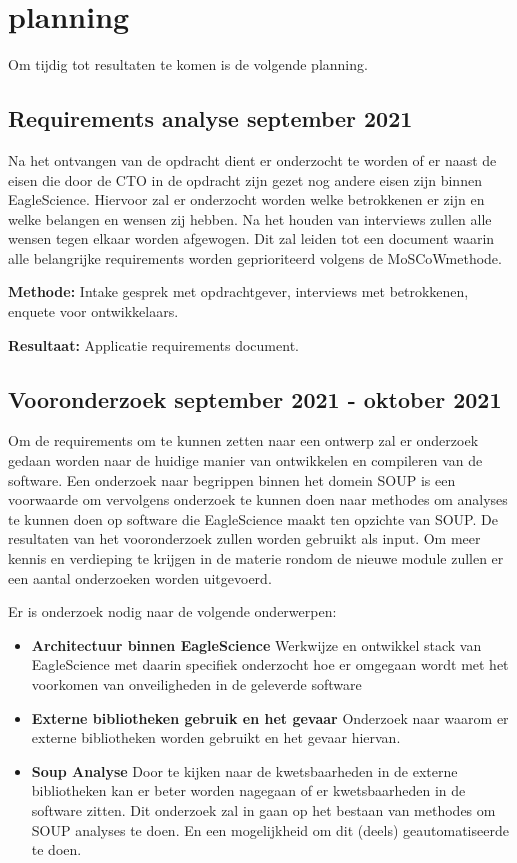 \section{planning}\label{sec:planning}
Om tijdig tot resultaten te komen is de volgende planning.

\subsection{Requirements analyse \textbf{september 2021}}\label{subsec:requirements-analyse}
Na het ontvangen van de opdracht dient er onderzocht te worden of er naast de eisen die door de CTO in de opdracht zijn gezet nog andere eisen zijn binnen EagleScience. Hiervoor zal er onderzocht worden welke betrokkenen er zijn en welke belangen en wensen zij hebben. Na het houden van interviews zullen alle wensen tegen elkaar worden afgewogen. Dit zal leiden tot een document waarin alle belangrijke requirements worden geprioriteerd volgens de MoSCoW\-methode.

\textbf{Methode:} Intake gesprek met opdrachtgever, interviews met betrokkenen, enquete voor ontwikkelaars.

\textbf{Resultaat:} Applicatie requirements document.

\subsection{Vooronderzoek \textbf{september 2021 - oktober 2021 }}\label{subsec:onderzoek}
Om de requirements om te kunnen zetten naar een ontwerp zal er onderzoek gedaan worden naar de huidige manier van ontwikkelen en compileren van de software. Een onderzoek naar begrippen binnen het domein SOUP is een voorwaarde om vervolgens onderzoek te kunnen doen naar methodes om analyses te kunnen doen op software die EagleScience maakt ten opzichte van SOUP. De resultaten van het vooronderzoek zullen worden gebruikt als input.
Om meer kennis en verdieping te krijgen in de materie rondom de nieuwe module zullen er een aantal onderzoeken worden uitgevoerd.


Er is onderzoek nodig naar de volgende onderwerpen:
\begin{itemize}
    \item \textbf{Architectuur binnen EagleScience} Werkwijze en ontwikkel stack van EagleScience met daarin specifiek onderzocht hoe er omgegaan wordt met het voorkomen van onveiligheden in de geleverde software
    \item \textbf{Externe bibliotheken gebruik en het gevaar} Onderzoek naar waarom er externe bibliotheken worden gebruikt en het gevaar hiervan.
    \item \textbf{Soup Analyse} Door te kijken naar de kwetsbaarheden in de externe bibliotheken kan er beter worden nagegaan of er kwetsbaarheden in de software zitten. Dit onderzoek zal in gaan op het bestaan van methodes om SOUP analyses te doen. En een mogelijkheid om dit (deels) geautomatiseerde te doen.
\end{itemize}


